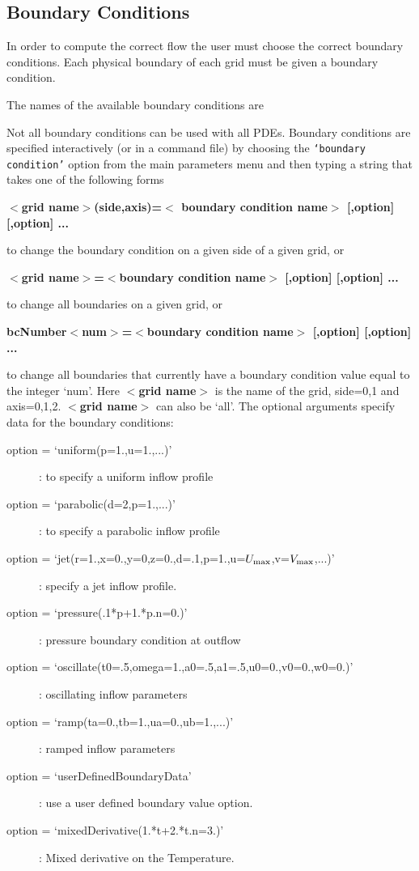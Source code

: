 \subsection{Boundary Conditions} \label{sec:bcMenu}

In order to compute the correct flow the user must choose the correct
boundary conditions. Each physical boundary of each grid must be
given a boundary condition.  

The names of the available boundary conditions are 
%

%
Not all boundary conditions can be used with all PDEs.
Boundary conditions are specified interactively (or in a command file)
by choosing the {\tt `boundary condition'} option from the main parameters menu
and then typing a string that takes one of the following forms
\begin{flushleft}
\bf $<$grid name$>$(side,axis)=$<$ boundary condition name$>$ [,option] [,option] ...
\end{flushleft}
to change the boundary condition on a given side of a given grid, or  
\begin{flushleft}
\bf $<$grid name$>$=$<$boundary condition name$>$  [,option] [,option] ...  
\end{flushleft}
to change all boundaries on a given grid, or
  \begin{flushleft}
\bf bcNumber$<$num$>$=$<$boundary condition name$>$  [,option] [,option] ...  
\end{flushleft}                             
to change all boundaries that currently have a boundary condition value equal to 
the integer `num'.
Here {\bf $<$grid name$>$} is the name of the grid, side=0,1 and axis=0,1,2.  
{\bf $<$grid name$>$} can also be `all'.
The optional arguments specify data for the boundary conditions:      
\begin{description}
  \item[option = `uniform(p=1.,u=1.,...)'] : to specify a uniform inflow profile   
  \item[option = `parabolic(d=2,p=1.,...)']     : to specify a parabolic inflow profile 
  \item[option = `jet(r=1.,x=0.,y=0,z=0.,d=.1,p=1.,u=$U_{\rm max}$,v=$V_{\rm max}$,...)'] : 
     specify a jet inflow profile.
  \item[ option = `pressure(.1*p+1.*p.n=0.)']     : pressure boundary condition at outflow
  \item[ option = `oscillate(t0=.5,omega=1.,a0=.5,a1=.5,u0=0.,v0=0.,w0=0.)']   : oscillating inflow parameters       
  \item[ option = `ramp(ta=0.,tb=1.,ua=0.,ub=1.,...)']   : ramped inflow parameters       
  \item[ option = `userDefinedBoundaryData'] : use a user defined boundary value option.
  \item[ option = `mixedDerivative(1.*t+2.*t.n=3.)'] : Mixed derivative on the Temperature.
\end{description}
